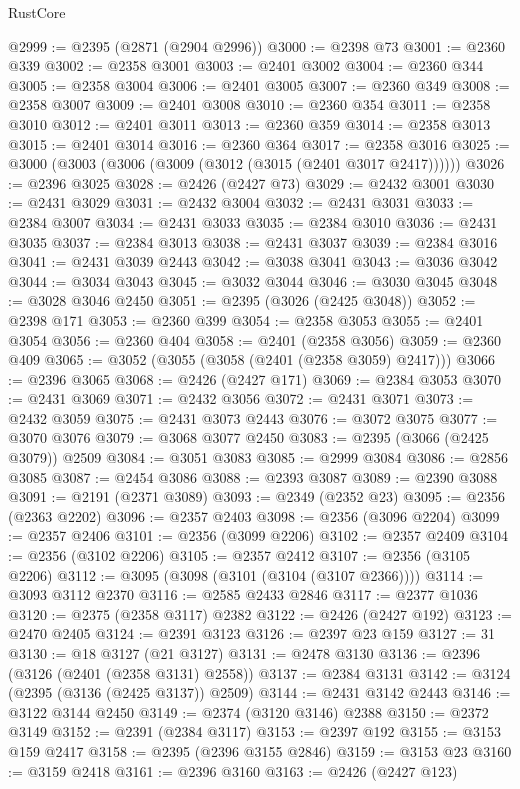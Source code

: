 \begin{lexlean}{RustCore}
\begin{coremodule}
@2999 := @2395 (@2871 (@2904 @2996))
@3000 := @2398 @73
@3001 := @2360 @339
@3002 := @2358 @3001
@3003 := @2401 @3002
@3004 := @2360 @344
@3005 := @2358 @3004
@3006 := @2401 @3005
@3007 := @2360 @349
@3008 := @2358 @3007
@3009 := @2401 @3008
@3010 := @2360 @354
@3011 := @2358 @3010
@3012 := @2401 @3011
@3013 := @2360 @359
@3014 := @2358 @3013
@3015 := @2401 @3014
@3016 := @2360 @364
@3017 := @2358 @3016
@3025 := @3000 (@3003 (@3006 (@3009 (@3012 (@3015 (@2401 @3017 @2417))))))
@3026 := @2396 @3025
@3028 := @2426 (@2427 @73)
@3029 := @2432 @3001
@3030 := @2431 @3029
@3031 := @2432 @3004
@3032 := @2431 @3031
@3033 := @2384 @3007
@3034 := @2431 @3033
@3035 := @2384 @3010
@3036 := @2431 @3035
@3037 := @2384 @3013
@3038 := @2431 @3037
@3039 := @2384 @3016
@3041 := @2431 @3039 @2443
@3042 := @3038 @3041
@3043 := @3036 @3042
@3044 := @3034 @3043
@3045 := @3032 @3044
@3046 := @3030 @3045
@3048 := @3028 @3046 @2450
@3051 := @2395 (@3026 (@2425 @3048))
@3052 := @2398 @171
@3053 := @2360 @399
@3054 := @2358 @3053
@3055 := @2401 @3054
@3056 := @2360 @404
@3058 := @2401 (@2358 @3056)
@3059 := @2360 @409
@3065 := @3052 (@3055 (@3058 (@2401 (@2358 @3059) @2417)))
@3066 := @2396 @3065
@3068 := @2426 (@2427 @171)
@3069 := @2384 @3053
@3070 := @2431 @3069
@3071 := @2432 @3056
@3072 := @2431 @3071
@3073 := @2432 @3059
@3075 := @2431 @3073 @2443
@3076 := @3072 @3075
@3077 := @3070 @3076
@3079 := @3068 @3077 @2450
@3083 := @2395 (@3066 (@2425 @3079)) @2509
@3084 := @3051 @3083
@3085 := @2999 @3084
@3086 := @2856 @3085
@3087 := @2454 @3086
@3088 := @2393 @3087
@3089 := @2390 @3088
@3091 := @2191 (@2371 @3089)
@3093 := @2349 (@2352 @23)
@3095 := @2356 (@2363 @2202)
@3096 := @2357 @2403
@3098 := @2356 (@3096 @2204)
@3099 := @2357 @2406
@3101 := @2356 (@3099 @2206)
@3102 := @2357 @2409
@3104 := @2356 (@3102 @2206)
@3105 := @2357 @2412
@3107 := @2356 (@3105 @2206)
@3112 := @3095 (@3098 (@3101 (@3104 (@3107 @2366))))
@3114 := @3093 @3112 @2370
@3116 := @2585 @2433 @2846
@3117 := @2377 @1036
@3120 := @2375 (@2358 @3117) @2382
@3122 := @2426 (@2427 @192)
@3123 := @2470 @2405
@3124 := @2391 @3123
@3126 := @2397 @23 @159
@3127 := 31
@3130 := @18 @3127 (@21 @3127)
@3131 := @2478 @3130
@3136 := @2396 (@3126 (@2401 (@2358 @3131) @2558))
@3137 := @2384 @3131
@3142 := @3124 (@2395 (@3136 (@2425 @3137)) @2509)
@3144 := @2431 @3142 @2443
@3146 := @3122 @3144 @2450
@3149 := @2374 (@3120 @3146) @2388
@3150 := @2372 @3149
@3152 := @2391 (@2384 @3117)
@3153 := @2397 @192
@3155 := @3153 @159 @2417
@3158 := @2395 (@2396 @3155 @2846)
@3159 := @3153 @23
@3160 := @3159 @2418
@3161 := @2396 @3160
@3163 := @2426 (@2427 @123)

\end{coremodule}
\end{lexlean}
